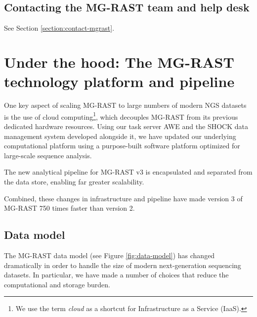 \documentclass[12pt,fullpage]{report}
\begin{document}
\section{Contacting the MG-RAST team and help desk}
See Section \ref{section:contact-mgrast}.


\chapter{Under the hood: The MG-RAST technology platform and pipeline}
One key aspect of scaling MG-RAST to large numbers of modern NGS datasets is the use of cloud computing\footnote{We use the term \textit{cloud} as a shortcut for Infrastructure as a Service (IaaS).}, which decouples MG-RAST from its previous dedicated hardware resources. Using our task server AWE \cite{AWE} and the SHOCK data management system developed alongside it, we have updated our underlying computational platform using a purpose-built software platform optimized for large-scale sequence analysis.

The new analytical pipeline for MG-RAST v3 is encapsulated and separated from the data store, enabling far greater scalability.

Combined, these changes in infrastructure and pipeline have made version 3 of MG-RAST 750 times faster than version 2.

% 
% 

\section{Data model}

The MG-RAST data model (see Figure \ref{fig:data-model}) has changed dramatically in order to handle the size of modern next-generation sequencing datasets. In particular, we have made a number of choices that reduce the computational and storage burden.
\end{document}
